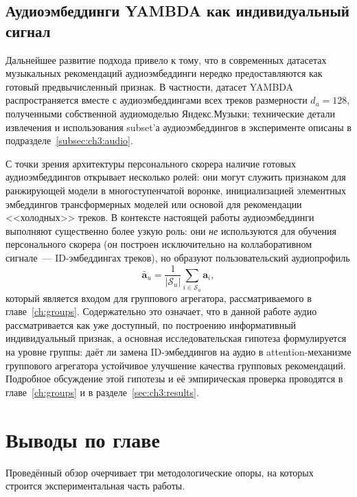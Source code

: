 \subsection{Аудиоэмбеддинги YAMBDA как индивидуальный сигнал}
\label{subsec:ch1:yambda-audio}

Дальнейшее развитие подхода привело к тому, что в современных датасетах музыкальных рекомендаций аудиоэмбеддинги нередко предоставляются как готовый предвычисленный признак. В частности, датасет YAMBDA~\cite{yambda2025} распространяется вместе с аудиоэмбеддингами всех треков размерности $d_a = 128$, полученными собственной аудиомоделью Яндекс.Музыки; технические детали извлечения и использования subset'а аудиоэмбеддингов в эксперименте описаны в подразделе~\ref{subsec:ch3:audio}.

С точки зрения архитектуры персонального скорера наличие готовых аудиоэмбеддингов открывает несколько ролей: они могут служить признаком для ранжирующей модели в многоступенчатой воронке, инициализацией элементных эмбеддингов трансформерных моделей или основой для рекомендации <<холодных>> треков. В контексте настоящей работы аудиоэмбеддинги выполняют существенно более узкую роль: они \emph{не} используются для обучения персонального скорера (он построен исключительно на коллаборативном сигнале~--- ID-эмбеддингах треков), но образуют пользовательский аудиопрофиль
\begin{equation}
    \bar{\mathbf{a}}_u = \frac{1}{|\mathcal{S}_u|} \sum_{i \in \mathcal{S}_u} \mathbf{a}_i,
    \label{eq:user-audio-profile}
\end{equation}
который является входом для группового агрегатора, рассматриваемого в главе~\ref{ch:groups}. Содержательно это означает, что в данной работе аудио рассматривается как уже доступный, по построению информативный индивидуальный признак, а основная исследовательская гипотеза формулируется на уровне группы: даёт ли замена ID-эмбеддингов на аудио в attention-механизме группового агрегатора устойчивое улучшение качества групповых рекомендаций. Подробное обсуждение этой гипотезы и её эмпирическая проверка проводятся в главе~\ref{ch:groups} и в разделе~\ref{sec:ch3:results}.

\section{Выводы по главе}
\label{sec:ch1:conclusion}

Проведённый обзор очерчивает три методологические опоры, на которых строится экспериментальная часть работы.

